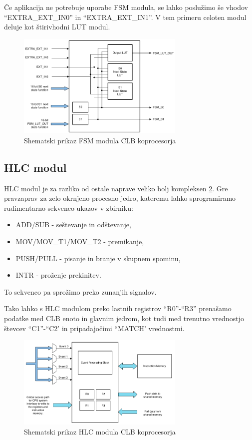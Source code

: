\documentclass[a4paper]{article}
\begin{document}
\begin{sloppypar}
Če aplikacija ne potrebuje uporabe FSM modula, se lahko poslužimo še vhodov
``EXTRA\_EXT\_IN0'' in ``EXTRA\_EXT\_IN1''. V tem primeru celoten modul deluje
kot štirivhodni LUT modul.

\begin{figure}[htb]
    \centerline{\includegraphics[width=8cm]{shema_fsm}}
    \caption{Shematski prikaz FSM modula CLB koprocesorja
             \cite[Pogl.~26.4.3]{mcu-ref-manual}}
    \label{fig:fsm} 
\end{figure} 

\subsection{HLC modul}\label{sec:hlc}
HLC modul je za razliko od ostale naprave veliko bolj kompleksen \ref{fig:hlc}. Gre pravzaprav za zelo okrnjeno procesno jedro, kateremu lahko sprogramiramo rudimentarno sekvenco ukazov v zbirniku\cite[Pogl.~26.4.6.2]{mcu-ref-manual}:
\begin{itemize}
    \item ADD/SUB - seštevanje in odštevanje,
    \item MOV/MOV\_T1/MOV\_T2 - premikanje,
    \item PUSH/PULL - pisanje in branje v skupnem spominu,
    \item INTR - proženje prekinitev.
\end{itemize}

To sekvenco pa sprožimo preko zunanjih signalov.

Tako lahko s HLC modulom preko lastnih registrov ``R0''-``R3''\cite[Pogl.~26.4.6]{mcu-ref-manual} prenašamo podatke med CLB enoto in glavnim jedrom, kot tudi med trenutno vrednostjo števcev ``C1''-``C2' in pripadajočimi ``MATCH' vrednostmi.

\begin{figure}[htb]
    \centerline{\includegraphics[width=8cm]{shema_hlc}}
    \caption{Shematski prikaz HLC modula CLB koprocesorja
             \cite[Pogl.~26.4.6]{mcu-ref-manual}}
    \label{fig:hlc} 
\end{figure}


\end{sloppypar}
\end{document}
